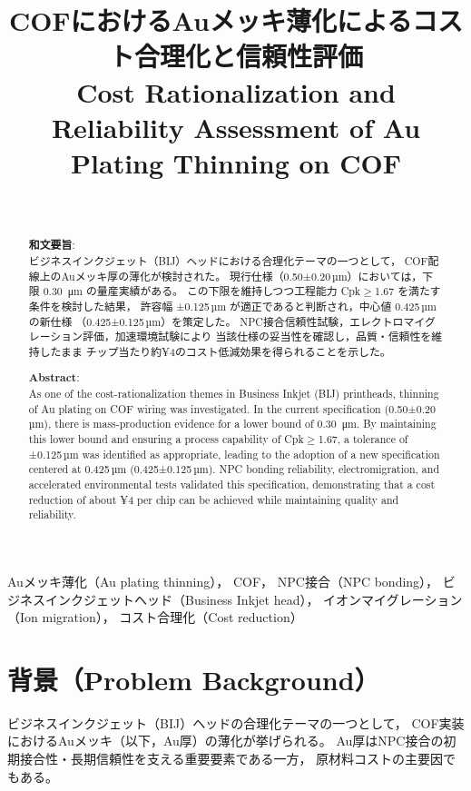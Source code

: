 \documentclass[conference]{IEEEtran}
\title{COFにおけるAuメッキ薄化によるコスト合理化と信頼性評価\\
\large Cost Rationalization and Reliability Assessment of Au Plating Thinning on COF}
\author{%
  \IEEEauthorblockN{三溝 真一（Shinichi Samizo)}\\
  \IEEEauthorblockA{独立系半導体研究者（元セイコーエプソン）\\
  Email: \href{mailto:shin3t72@gmail.com}{shin3t72@gmail.com}\\
  GitHub: \url{https://github.com/Samizo-AITL}}%
}
\begin{document}
\maketitle

\begin{abstract}
\textbf{和文要旨}:\\
ビジネスインクジェット（BIJ）ヘッドにおける合理化テーマの一つとして，
COF配線上のAuメッキ厚の薄化が検討された。
現行仕様（0.50±0.20\,µm）においては，下限 \SI{0.30}{\micro\metre} の量産実績がある。
この下限を維持しつつ工程能力 Cpk$\geq$1.67 を満たす条件を検討した結果，
許容幅 ±0.125\,µm が適正であると判断され，中心値 0.425\,µm の新仕様
（0.425±0.125\,µm）を策定した。
NPC接合信頼性試験，エレクトロマイグレーション評価，加速環境試験により
当該仕様の妥当性を確認し，品質・信頼性を維持したまま
チップ当たり約¥4のコスト低減効果を得られることを示した。

\medskip
\noindent\textbf{Abstract}:\\
As one of the cost-rationalization themes in Business Inkjet (BIJ) printheads,
thinning of Au plating on COF wiring was investigated.
In the current specification (0.50±0.20\,µm), there is mass-production evidence
for a lower bound of \SI{0.30}{\micro\metre}.
By maintaining this lower bound and ensuring a process capability of Cpk$\geq$1.67,
a tolerance of ±0.125\,µm was identified as appropriate,
leading to the adoption of a new specification centered at 0.425\,µm (0.425±0.125\,µm).
NPC bonding reliability, electromigration, and accelerated environmental tests
validated this specification, demonstrating that a cost reduction of about
¥4 per chip can be achieved while maintaining quality and reliability.
\end{abstract}

\begin{IEEEkeywords}
Auメッキ薄化（Au plating thinning），
COF，
NPC接合（NPC bonding），
ビジネスインクジェットヘッド（Business Inkjet head），
イオンマイグレーション（Ion migration），
コスト合理化（Cost reduction）
\end{IEEEkeywords}

\section{背景（Problem Background）}
ビジネスインクジェット（BIJ）ヘッドの合理化テーマの一つとして，
COF実装におけるAuメッキ（以下，Au厚）の薄化が挙げられる。
Au厚はNPC接合の初期接合性・長期信頼性を支える重要要素である一方，
原材料コストの主要因でもある。
\end{document}
